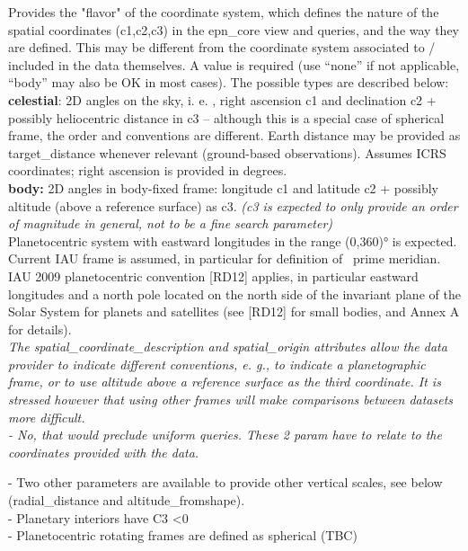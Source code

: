 \documentclass[11pt,a4paper]{ivoa}
\begin{document}
Provides the "flavor" of the coordinate system, which defines the nature of the spatial coordinates (c1,c2,c3) in the epn\_core view and queries, and the way they are defined. This may be different from the coordinate system associated to / included in the data themselves. A value is required (use ``none'' if not applicable, ``body'' may also be OK in most cases). The possible types are described below: \\ \textbf{celestial}: 2D angles on the sky, i. e. , right ascension c1 and declination c2 + possibly heliocentric distance in c3 – although this is a special case of spherical frame, the order and conventions are different. Earth distance may be provided as target\_distance whenever relevant (ground-based observations). Assumes ICRS coordinates; right ascension is provided in degrees.\\ \textbf{body:} 2D angles in body-fixed frame: longitude c1 and latitude c2 + possibly altitude (above a reference surface) as c3. \emph{(c3 is expected to only provide an order of magnitude in general, not to be a fine search parameter)}\\Planetocentric system with eastward longitudes in the range (0,360)° is expected. Current IAU frame is assumed, in particular for definition of  prime meridian.\\IAU 2009 planetocentric convention [RD12] applies, in particular eastward longitudes and a north pole located on the north side of the invariant plane of the Solar System for planets and satellites (see [RD12] for small bodies, and Annex A for details). \emph{ }\\\emph{ The spatial\_coordinate\_description and spatial\_origin attributes allow the data provider to indicate different conventions, e. g., to indicate a planetographic frame, or to use altitude above a reference surface as the third coordinate. It is stressed however that using other frames will make comparisons between datasets more difficult.\\- No, that would preclude uniform queries. These 2 param have to relate to the coordinates provided with the data.\\}

- Two other parameters are available to provide other vertical scales, see below (radial\_distance and altitude\_fromshape). \\- Planetary interiors have C3 <0 \\- Planetocentric rotating frames are defined as spherical (TBC)\\
\end{document}
